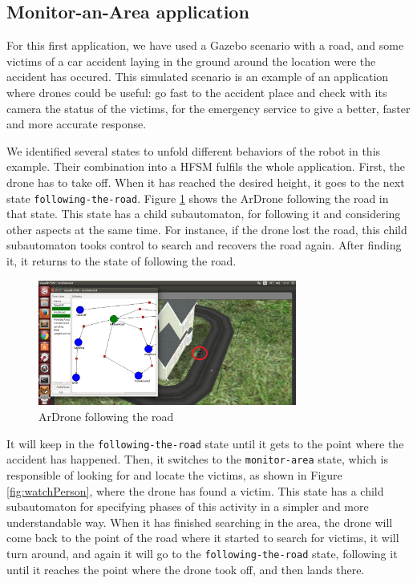 \documentclass[journal,twoside]{JoPhA}
\begin{document}
\subsection{Monitor-an-Area application}
For this first application, we have used a Gazebo scenario with a road, and some victims of a car accident laying in the ground around the location were the accident has occured. This simulated scenario is an example of an application where drones could be useful: go fast to the accident place and check with its camera the status of the victims, for the emergency service to give a better, faster and more accurate response. 

We identified several states to unfold different behaviors of the robot in this example. Their combination into a HFSM fulfils the whole application. First, the drone has to take off. When it has reached the desired height, it goes to the next state \texttt{following-the-road}. Figure \ref{fig:followingRoad} shows the ArDrone following the road in that state. This state has a child subautomaton, for following it and considering other aspects at the same time. For instance, if the drone lost the road, this child subautomaton tooks control to search and recovers the road again. After finding it, it returns to the state of following the road. 

\begin{figure}[ht!]
\begin{center}
        \includegraphics[width=8.5cm]{figs/followingRoad.png}
\end{center}
\caption{ArDrone following the road}
\label{fig:followingRoad}
\end{figure}

It will keep in the \texttt{following-the-road} state until it gets to the point where the accident has happened. Then, it switches to the \texttt{monitor-area} state, which is responsible of looking for and locate the victims, as shown in Figure \ref{fig:watchPerson}, where the drone has found a victim. This state has a child subautomaton for specifying phases of this activity in a simpler and more understandable way. 
When it has finished searching in the area, the drone will come back to the point of the road where it started to search for victims, it will turn around, and again it will go to the \texttt{following-the-road} state, following it until it reaches the point where the drone took off, and then lands there. 
\end{document}
